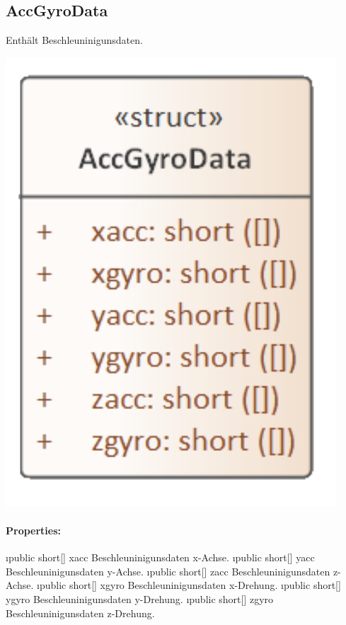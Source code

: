 \documentclass[../entwurf.tex]{subfiles}
\begin{document}
    \subsection{AccGyroData}
        Enthält Beschleuninigunsdaten.
        \begin{center}
            \includegraphics[page=1,width=350pt,keepaspectratio]{../uml_klassen/StepDetectionLib/AccGyroData.png}
        \end{center}
        \paragraph{Properties:}
        \begin{itemize}
            \i{public short[] xacc} Beschleuninigunsdaten x-Achse.
            \i{public short[] yacc} Beschleuninigunsdaten y-Achse.
            \i{public short[] zacc} Beschleuninigunsdaten z-Achse.
            \i{public short[] xgyro} Beschleuninigunsdaten x-Drehung.
            \i{public short[] ygyro} Beschleuninigunsdaten y-Drehung.
            \i{public short[] zgyro} Beschleuninigunsdaten z-Drehung.
        \end{itemize}
\end{document}

